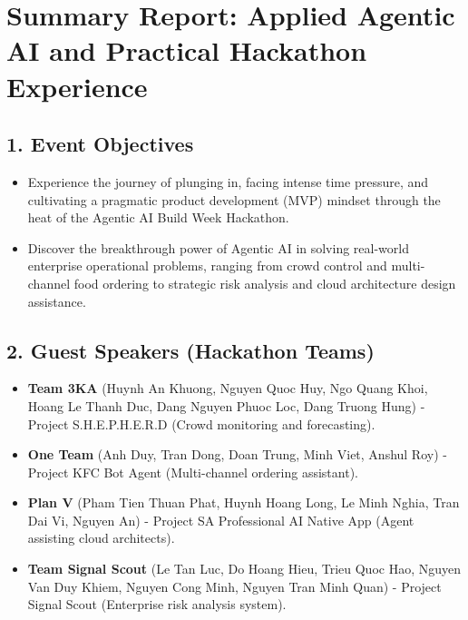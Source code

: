 \hypertarget{summary-report-applied-agentic-ai-and-practical-hackathon-experience}{%
\section{Summary Report: Applied Agentic AI and Practical Hackathon
Experience}}

\hypertarget{event-objectives}{%
\subsection{1. Event Objectives}}

\begin{itemize}
\tightlist
\item
  Experience the journey of plunging in, facing intense time pressure,
  and cultivating a pragmatic product development (MVP) mindset through
  the heat of the Agentic AI Build Week Hackathon.
\item
  Discover the breakthrough power of Agentic AI in solving real-world
  enterprise operational problems, ranging from crowd control and
  multi-channel food ordering to strategic risk analysis and cloud
  architecture design assistance.
\end{itemize}

\hypertarget{guest-speakers-hackathon-teams}{%
\subsection{2. Guest Speakers (Hackathon
Teams)}}

\begin{itemize}
\tightlist
\item
  \textbf{Team 3KA} (Huynh An Khuong, Nguyen Quoc Huy, Ngo Quang Khoi,
  Hoang Le Thanh Duc, Dang Nguyen Phuoc Loc, Dang Truong Hung) - Project
  S.H.E.P.H.E.R.D (Crowd monitoring and forecasting).
\item
  \textbf{One Team} (Anh Duy, Tran Dong, Doan Trung, Minh Viet, Anshul
  Roy) - Project KFC Bot Agent (Multi-channel ordering assistant).
\item
  \textbf{Plan V} (Pham Tien Thuan Phat, Huynh Hoang Long, Le Minh
  Nghia, Tran Dai Vi, Nguyen An) - Project SA Professional AI Native App
  (Agent assisting cloud architects).
\item
  \textbf{Team Signal Scout} (Le Tan Luc, Do Hoang Hieu, Trieu Quoc Hao,
  Nguyen Van Duy Khiem, Nguyen Cong Minh, Nguyen Tran Minh Quan) -
  Project Signal Scout (Enterprise risk analysis system).
\end{itemize}

